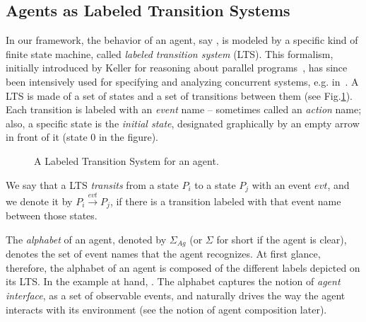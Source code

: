 \subsection{Agents as Labeled Transition Systems}

In our framework, the behavior of an agent, say , is modeled by a specific kind of finite state machine, called \emph{labeled transition system} (LTS). This formalism, initially introduced by Keller for reasoning about parallel programs~\cite{Keller:1976}, has since been intensively used for specifying and analyzing concurrent systems, e.g. in~\cite{Milner:1989, Clarke:1989, Magee:1997}. A LTS is made of a set of states and a set of transitions between them (see Fig.\ref{image:framework-start-stop}). Each transition is labeled with an \emph{event} name -- sometimes called an \emph{action} name; also, a specific state is the \emph{initial state}, designated graphically by an empty arrow in front of it (state 0 in the figure). 

\begin{figure}[H]
\centering{}
  \caption{A Labeled Transition System for an  agent\label{image:framework-start-stop}.}
\end{figure}

We say that a LTS \emph{transits} from a state $P_i$ to a state $P_j$ with an event $evt$, and we denote it by $P_i \stackrel{evt}{\longrightarrow} P_j$, if there is a transition labeled with that event name between those states.

The \emph{alphabet} of an agent, denoted by $\Sigma_{Ag}$ (or $\Sigma$ for short if the agent is clear),  denotes the set of event names that the agent recognizes. At first glance, therefore, the alphabet of an agent is composed of the different labels depicted on its LTS. In the example at hand, . The alphabet captures the notion of \emph{agent interface}, as a set of observable events, and naturally drives the way the agent interacts with its environment (see the notion of agent composition later).

